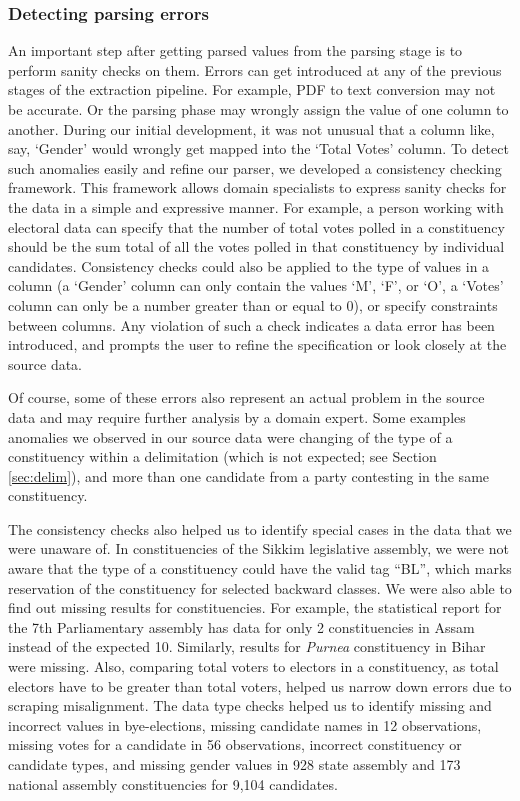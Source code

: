 \subsubsection{Detecting parsing errors} An important step after getting parsed values from the parsing stage is to perform sanity checks on them. Errors can get introduced at any of the previous stages of the extraction pipeline. For example, PDF to text conversion may not be accurate. Or the parsing phase may wrongly assign the value of one column to another. During our initial development, it was not unusual that a column like, say, `Gender'  would wrongly get mapped into the `Total Votes' column. To detect such anomalies easily and refine our parser, we developed a consistency checking framework. This framework allows domain specialists to express sanity checks for the data in a simple and expressive manner. For example, a person working with electoral data can specify that the number of total votes polled in a constituency should be the sum total of all the votes polled in that constituency by individual candidates. Consistency checks could also be applied to the type of values in a column (a `Gender' column can only contain the values `M', `F', or `O', a `Votes' column can only be a number greater than or equal to 0), or specify constraints between columns. Any violation of such a check indicates a data error has been introduced, and prompts the user to refine the specification or look closely at the source data.

Of course, some of these errors also represent an actual problem in the source data and may require further analysis by a domain expert. Some examples anomalies we observed in our source data were changing of the type of a constituency within a delimitation (which is not expected; see Section \ref{sec:delim}), and more than one candidate from a party contesting in the same constituency.

The consistency checks also helped us to identify special cases in the data that we were unaware of. In constituencies of the Sikkim legislative assembly, we were not aware that the type of a constituency could have the valid tag ``BL'', which marks reservation of the constituency for selected backward classes. We were also able to find out missing results for constituencies. For example, the statistical report for the 7th Parliamentary assembly has data for only 2 constituencies in Assam instead of the expected 10. Similarly, results for \emph{Purnea} constituency in Bihar were missing. Also, comparing total voters to electors in a constituency, as total electors have to be greater than total voters, helped us narrow down errors due to scraping misalignment. The data type checks helped us to identify  missing and incorrect values in bye-elections, missing candidate names in 12 observations, missing votes for a candidate in 56 observations, incorrect constituency or candidate types, and missing gender values in 928 state assembly and 173 national assembly constituencies for 9,104 candidates.

